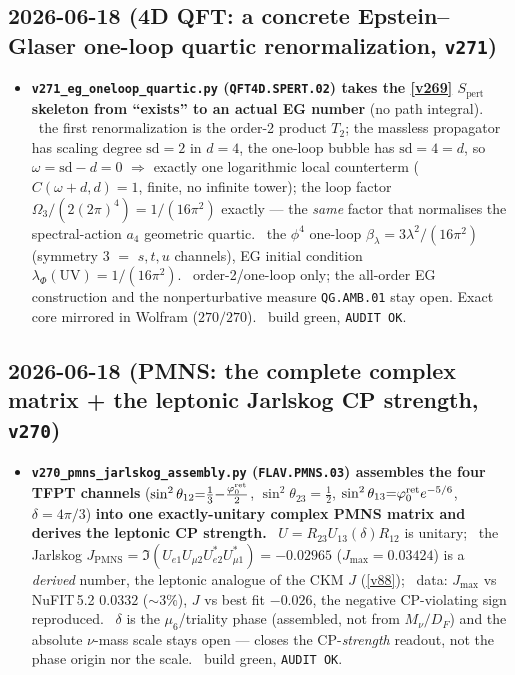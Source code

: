 \subsection*{2026-06-18 (4D QFT: a concrete Epstein--Glaser one-loop quartic renormalization, \texttt{v271})}
\begin{itemize}
\item \textbf{\texttt{v271\_eg\_oneloop\_quartic.py} (\texttt{QFT4D.SPERT.02}) takes the \vref{v269} $S_{\mathrm{pert}}$
  skeleton from ``exists'' to an actual EG number} (no path integral). \mE\ the first renormalization is the
  order-2 product $T_2$; the massless propagator has scaling degree $\mathrm{sd}{=}2$ in $d{=}4$, the one-loop
  bubble has $\mathrm{sd}{=}4{=}d$, so $\omega{=}\mathrm{sd}{-}d{=}0$ $\Rightarrow$ exactly one logarithmic local
  counterterm ($C(\omega{+}d,d){=}1$, finite, no infinite tower); the loop factor $\Omega_3/(2(2\pi)^4)=1/(16\pi^2)$
  exactly --- the \emph{same} factor that normalises the spectral-action $a_4$ geometric quartic. \mC\ the
  $\phi^4$ one-loop $\beta_\lambda=3\lambda^2/(16\pi^2)$ (symmetry $3$ $=$ $s,t,u$ channels), EG initial condition
  $\lambda_\Phi(\mathrm{UV})=1/(16\pi^2)$. \mO\ order-2/one-loop only; the all-order EG construction and the
  nonperturbative measure \texttt{QG.AMB.01} stay open. Exact core mirrored in Wolfram ($270/270$). \mE\ build
  green, \texttt{AUDIT OK}.
\end{itemize}

\subsection*{2026-06-18 (PMNS: the complete complex matrix + the leptonic Jarlskog CP strength, \texttt{v270})}
\begin{itemize}
\item \textbf{\texttt{v270\_pmns\_jarlskog\_assembly.py} (\texttt{FLAV.PMNS.03}) assembles the four TFPT
  channels} ($\sin^2\theta_{12}{=}\tfrac13{-}\tfrac{\varphi_0^{\mathrm{ret}}}2$, $\sin^2\theta_{23}{=}\tfrac12$,
  $\sin^2\theta_{13}{=}\varphi_0^{\mathrm{ret}} e^{-5/6}$, $\delta{=}4\pi/3$) \textbf{into one exactly-unitary complex PMNS
  matrix and derives the leptonic CP strength.} \mE\ $U=R_{23}U_{13}(\delta)R_{12}$ is unitary; \mC\ the
  Jarlskog $J_{\mathrm{PMNS}}=\Im(U_{e1}U_{\mu2}U_{e2}^{*}U_{\mu1}^{*})=-0.02965$ ($J_{\max}=0.03424$) is a
  \emph{derived} number, the leptonic analogue of the CKM $J$ (\vref{v88}); \mC\ data: $J_{\max}$ vs NuFIT\,5.2
  $0.0332$ ($\sim3\%$), $J$ vs best fit $-0.026$, the negative CP-violating sign reproduced. \mO\ $\delta$ is
  the $\mu_6$/triality phase (assembled, not from $M_\nu/D_F$) and the absolute $\nu$-mass scale stays open ---
  closes the CP-\emph{strength} readout, not the phase origin nor the scale. \mE\ build green, \texttt{AUDIT OK}.
\end{itemize}

